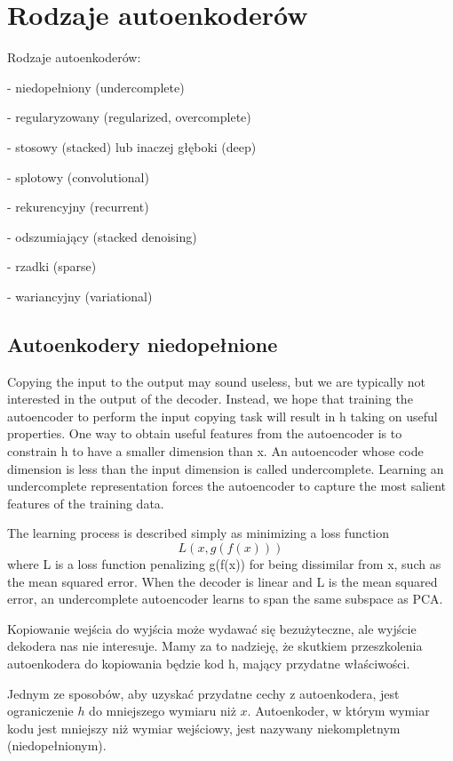 \documentclass[12pt]{mwbk}
\theoremstyle{plain}
\theoremstyle{definition}
\theoremstyle{remark}
\begin{document}
\section{Rodzaje autoenkoderów}

Rodzaje autoenkoderów:

- niedopełniony (undercomplete)

 - regularyzowany (regularized, overcomplete)

- stosowy (stacked) lub inaczej głęboki (deep)

- splotowy (convolutional)

- rekurencyjny (recurrent)

- odszumiający (stacked denoising)

- rzadki (sparse)

- wariancyjny (variational)



\subsection{Autoenkodery niedopełnione}

\cite{goodfellow}

Copying the input to the output may sound useless, but we are typically not
interested in the output of the decoder. Instead, we hope that training the
autoencoder to perform the input copying task will result in h taking on useful
properties.
One way to obtain useful features from the autoencoder is to constrain h to
have a smaller dimension than x. An autoencoder whose code dimension is less
than the input dimension is called undercomplete. Learning an undercomplete
representation forces the autoencoder to capture the most salient features of the
training data.

The learning process is described simply as minimizing a loss function
$$L(x, g(f(x)))$$
where L is a loss function penalizing g(f(x)) for being dissimilar from x, such as
the mean squared error.
When the decoder is linear and L is the mean squared error, an undercomplete
autoencoder learns to span the same subspace as PCA.


Kopiowanie wejścia do wyjścia może wydawać się bezużyteczne, ale wyjście dekodera nas nie interesuje. Mamy za to nadzieję, że skutkiem przeszkolenia autoenkodera do kopiowania będzie kod h, mający przydatne właściwości.

Jednym ze sposobów, aby uzyskać przydatne cechy z autoenkodera, jest ograniczenie $h$ do mniejszego wymiaru niż $x$. Autoenkoder, w którym wymiar kodu jest mniejszy niż wymiar wejściowy, jest nazywany niekompletnym (niedopełnionym).
\end{document}
